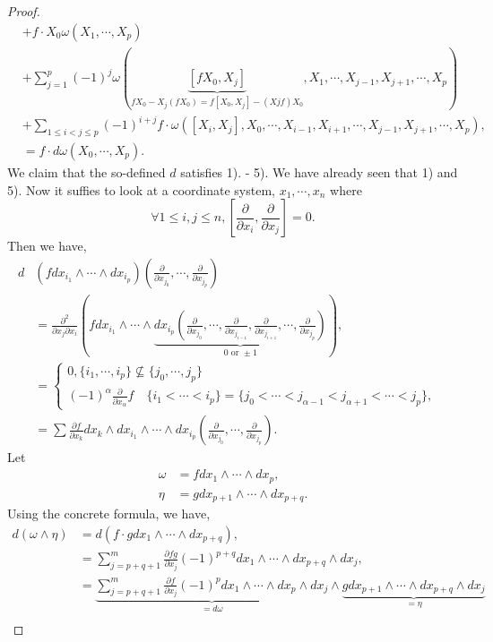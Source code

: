 \documentclass[8pt]{article}
\newcommand{\pd}[2]{{\frac {\partial #1} {\partial #2}}}
\begin{document}
\begin{proof}
\begin{align*}
    &+f\cdot X_0\omega(X_1,\cdots,X_p)\\
    & + \sum_{j=1}^p(-1)^j\omega(\underbrace{[fX_0,X_j]}_{fX_0-X_j(fX_0) = f[X_0,X_j]-(Xjf)X_0},X_1,\cdots,X_{j-1},X_{j+1},\cdots,X_p)\\
    & + \sum_{1\leq i< j\leq p}(-1)^{i+j}f\cdot\omega([X_i,X_j],X_0,\cdots,X_{i-1},X_{i+1},\cdots,X_{j-1},X_{j+1},\cdots,X_p),\\
    & = f\cdot d\omega(X_0,\cdots,X_p).
  \end{align*}
  We claim that the so-defined $d$ satisfies 1). - 5). We have already seen that 1) and 5). Now it suffies to look at a coordinate system, $x_1,\cdots,x_n$ where 
  \begin{equation*}
    \forall 1\leq i,j\leq n, \left[\pd{}{x_i},\pd{}{x_j}\right] = 0.
  \end{equation*}
  Then we have,
  \begin{align*}
    d&(fdx_{i_1}\wedge\cdots\wedge dx_{i_p})\left(\pd{}{x_{j_0}},\cdots,\pd{}{x_{j_p}}\right) &\\
    &= {\frac {\partial^2} {\partial x_j\partial x_i}}\left(fdx_{i_1}\wedge\cdots\wedge \underbrace{dx_{i_p}\left(\pd{}{x_{j_0}},\cdots,\pd{}{x_{j_{i-1}}},\pd{}{x_{j_{i+1}}},\cdots,\pd{}{x_{j_p}}\right)}_{0\text{ or }\pm 1}\right),\\
    & = \begin{cases}
      0, \{i_1,\cdots,i_p\}\not\subseteq\{j_0,\cdots,j_p\}\\
      (-1)^\alpha {\frac{\partial}{\partial x_{\alpha}}} f \quad \{i_1<\cdots<i_p\}=\{j_0<\cdots<j_{\alpha-1}<j_{\alpha+1}<\cdots<j_p\},
    \end{cases}
    \\
    & = \sum \pd{f}{x_k}dx_k\wedge dx_{i_1}\wedge\cdots\wedge dx_{i_p}\left(\pd{}{x_{j_0}},\cdots,\pd{}{x_{j_p}}\right).
  \end{align*}
  Let 
\begin{align*}
  \omega &= f dx_1\wedge\cdots\wedge dx_{p},\\
  \eta & = g dx_{p+1}\wedge\cdots\wedge dx_{p+q}.
\end{align*}
Using the concrete formula, we have,
\begin{align*}
  d(\omega\wedge\eta) & = d(f\cdot g dx_1\wedge\cdots\wedge dx_{p+q}),\\
  & = \sum_{j=p+q+1}^m \pd{fg}{x_j}(-1)^{p+q}dx_1\wedge\cdots\wedge dx_{p+q}\wedge dx_j,\\
  & = \underbrace{\sum_{j=p+q+1}^m \pd{f}{x_j}(-1)^p dx_1\wedge\cdots \wedge dx_p\wedge dx_j}_{=d\omega}\wedge \underbrace{gdx_{p+1}\wedge\cdots\wedge dx_{p+q}\wedge dx_j}_{=\eta}\\

\end{align*}
\end{proof}
\end{document}
